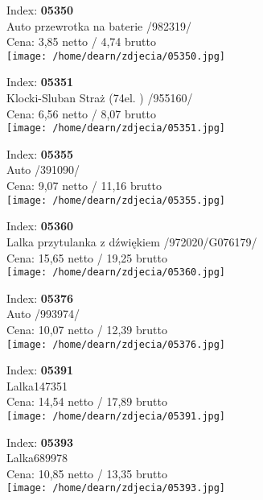 {Index: \textbf{05350}\\
Auto przewrotka na baterie /982319/\\
Cena: 3,85 netto / 4,74 brutto\\
  \texttt{[image: /home/dearn/zdjecia/05350.jpg]}}\newline\newline

{Index: \textbf{05351}\\
Klocki-Sluban Straż (74el. )  /955160/\\
Cena: 6,56 netto / 8,07 brutto\\
  \texttt{[image: /home/dearn/zdjecia/05351.jpg]}}\newline\newline

{Index: \textbf{05355}\\
Auto  /391090/\\
Cena: 9,07 netto / 11,16 brutto\\
  \texttt{[image: /home/dearn/zdjecia/05355.jpg]}}\newline\newline

{Index: \textbf{05360}\\
Lalka przytulanka z dźwiękiem /972020/G076179/\\
Cena: 15,65 netto / 19,25 brutto\\
  \texttt{[image: /home/dearn/zdjecia/05360.jpg]}}\newline\newline

{Index: \textbf{05376}\\
Auto /993974/\\
Cena: 10,07 netto / 12,39 brutto\\
  \texttt{[image: /home/dearn/zdjecia/05376.jpg]}}\newline\newline

{Index: \textbf{05391}\\
Lalka147351\\
Cena: 14,54 netto / 17,89 brutto\\
  \texttt{[image: /home/dearn/zdjecia/05391.jpg]}}\newline\newline

{Index: \textbf{05393}\\
Lalka689978\\
Cena: 10,85 netto / 13,35 brutto\\
  \texttt{[image: /home/dearn/zdjecia/05393.jpg]}}\newline\newline

